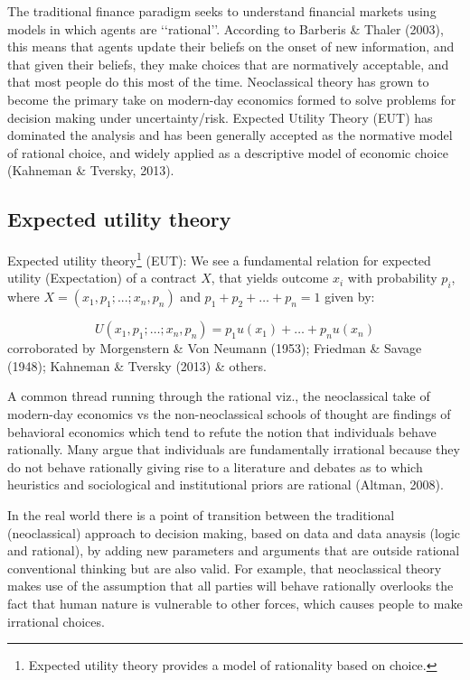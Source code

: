 \documentclass{DissertateUSU}
\begin{document}
The traditional finance paradigm seeks to understand financial markets
using models in which agents are \lq\lq rational\rq\rq. According to
Barberis \& Thaler (2003), this means that agents update their beliefs
on the onset of new information, and that given their beliefs, they make
choices that are normatively acceptable, and that most people do this
most of the time. Neoclassical theory has grown to become the primary
take on modern-day economics formed to solve problems for decision
making under uncertainty/risk. Expected Utility Theory (EUT) has
dominated the analysis and has been generally accepted as the normative
model of rational choice, and widely applied as a descriptive model of
economic choice (Kahneman \& Tversky, 2013).

\subsection{Expected utility theory}
\label{ssec:Expected utility theory}

Expected utility
theory\footnote{Expected utility theory provides a model of rationality based on choice.}
(EUT): We see a fundamental relation for expected utility (Expectation)
of a contract \(X\), that yields outcome \(x_i\) with probability
\(p_i\), where \(X = (x_1,p_1; ...; x_n,p_n)\) and
\(p_1+p_2+\ldots+p_n=1\) given by:

\singlespacing

\begin{equation}\label{EUT_extended}
U(x_1,p_1;\ldots;x_n,p_n) = p_1u(x_1)+\ldots+p_nu(x_n) 
\end{equation} \doublespacing corroborated by Morgenstern \& Von Neumann
(1953); Friedman \& Savage (1948); Kahneman \& Tversky (2013) \& others.

A common thread running through the rational viz., the neoclassical take
of modern-day economics vs the non-neoclassical schools of thought are
findings of behavioral economics which tend to refute the notion that
individuals behave rationally. Many argue that individuals are
fundamentally irrational because they do not behave rationally giving
rise to a literature and debates as to which heuristics and sociological
and institutional priors are rational (Altman, 2008).\medskip

In the real world there is a point of transition between the traditional
(neoclassical) approach to decision making, based on data and data
anaysis (logic and rational), by adding new parameters and arguments
that are outside rational conventional thinking but are also valid. For
example, that neoclassical theory makes use of the assumption that all
parties will behave rationally overlooks the fact that human nature is
vulnerable to other forces, which causes people to make irrational
choices.\medskip 
\end{document}
